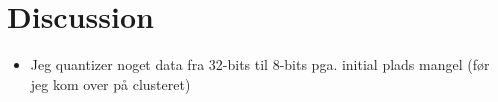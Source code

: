 \documentclass[./main.tex]{subfiles}
\begin{document}
\section{Discussion}
\begin{itemize}
    \item Jeg quantizer noget data fra 32-bits til 8-bits pga. initial plads mangel (før jeg kom over på clusteret)
\end{itemize}
\end{document}
